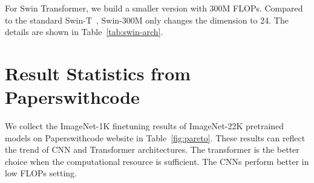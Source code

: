\documentclass{article}
\begin{document}
\begin{appendices}
For Swin Transformer, we build a smaller version with 300M FLOPs. Compared to the standard Swin-T~\cite{swin}, Swin-300M only changes the dimension to 24. The details are shown in Table~\ref{tab:swin-arch}.

\section{Result Statistics from Paperswithcode}\label{sec:paperswithcode}
We collect the ImageNet-1K finetuning results of ImageNet-22K pretrained models on Paperswithcode website
 in Table~\ref{fig:pareto}. These results can reflect the trend of CNN and Transformer architectures. The transformer is the better choice when the computational resource is sufficient. The CNNs perform better in low FLOPs setting.
\end{appendices}

{\small


}
\end{document}
